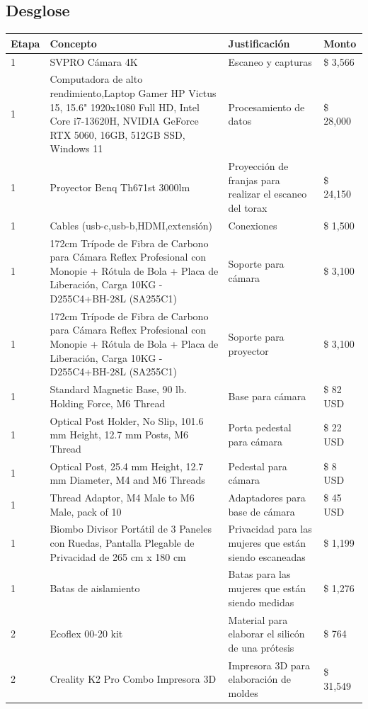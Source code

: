 \documentclass[12pt,a4paper]{article}
\begin{document}
\subsection{Desglose}
\begin{longtable}{p{0.8cm} p{7cm} p{5cm} p{2cm}}
\toprule
Etapa & Concepto & Justificación & Monto \\
\midrule
1 & SVPRO Cámara 4K  & Escaneo y capturas & \$ 3,566\\
1 & Computadora de alto rendimiento,Laptop Gamer HP Victus 15, 15.6" 1920x1080 Full HD, Intel Core i7-13620H, NVIDIA GeForce RTX 5060, 16GB, 512GB SSD, Windows 11 & Procesamiento de datos & \$ 28,000 \\
1 & Proyector Benq Th671st 3000lm & Proyección de franjas para realizar el escaneo del torax & \$ 24,150 \\
1 & Cables (usb-c,usb-b,HDMI,extensión) & Conexiones & \$ 1,500 \\
1 & 172cm Trípode de Fibra de Carbono para Cámara Reflex Profesional con Monopie + Rótula de Bola + Placa de Liberación, Carga 10KG - D255C4+BH-28L (SA255C1) & Soporte para cámara & \$ 3,100 \\
1 & 172cm Trípode de Fibra de Carbono para Cámara Reflex Profesional con Monopie + Rótula de Bola + Placa de Liberación, Carga 10KG - D255C4+BH-28L (SA255C1) & Soporte para proyector & \$ 3,100 \\
1 & Standard Magnetic Base, 90 lb. Holding Force, M6 Thread  & Base para cámara & \$ 82 USD \\
1 & Optical Post Holder, No Slip, 101.6 mm Height, 12.7 mm Posts, M6 Thread  & Porta pedestal para cámara & \$ 22 USD \\
1 & Optical Post, 25.4 mm Height, 12.7 mm Diameter, M4 and M6 Threads & Pedestal para cámara & \$ 8 USD \\
1 & Thread Adaptor, M4 Male to M6 Male, pack of 10 & Adaptadores para base de cámara & \$ 45 USD \\
1 & Biombo Divisor Portátil de 3 Paneles con Ruedas, Pantalla Plegable de Privacidad de 265 cm x 180 cm & Privacidad para las mujeres que están siendo escaneadas & \$ 1,199 \\
1 & Batas de aislamiento & Batas para las mujeres que están siendo medidas & \$ 1,276 \\
2 & Ecoflex 00-20 kit & Material para elaborar el silicón de una prótesis & \$ 764 \\
2 & Creality K2 Pro Combo Impresora 3D & Impresora 3D para elaboración de moldes & \$ 31,549 \\

\end{longtable}
\end{document}
